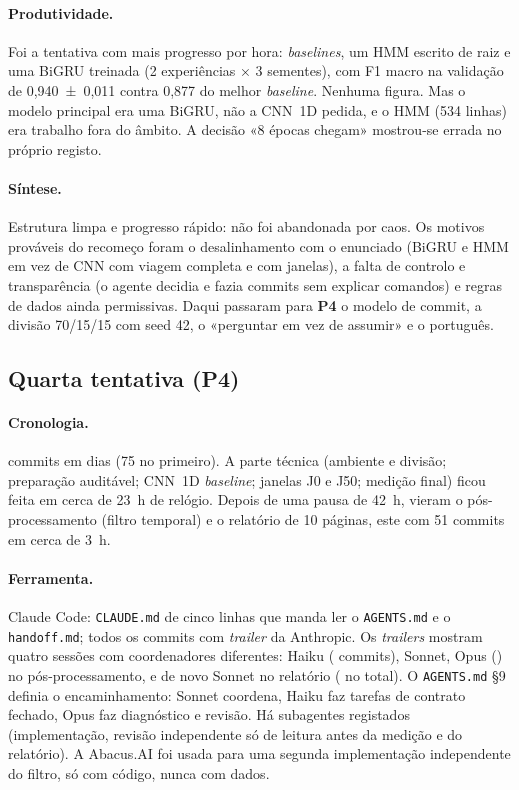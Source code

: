 \documentclass[11pt,a4paper]{article}
\newcommand{\Pquatro}{\textbf{P4}}
\begin{document}
\paragraph{Produtividade.} Foi a tentativa com mais progresso por hora: \emph{baselines},
um HMM escrito de raiz e uma BiGRU treinada (2 experiências × 3 sementes), com F1 macro na
validação de 0,940~±~0,011 contra 0,877 do melhor \emph{baseline}. Nenhuma figura. Mas o modelo
principal era uma BiGRU, não a CNN~1D pedida, e o HMM (534 linhas) era trabalho fora do âmbito.
A decisão «8 épocas chegam» mostrou-se errada no próprio registo.

\paragraph{Síntese.} Estrutura limpa e progresso rápido: não foi abandonada por caos. Os motivos prováveis
do recomeço foram o desalinhamento com o enunciado (BiGRU e HMM em vez de CNN com viagem completa
e com janelas), a falta de controlo e transparência (o agente decidia e fazia commits sem
explicar comandos) e regras de dados ainda permissivas. Daqui passaram para \Pquatro{} o modelo de
commit, a divisão 70/15/15 com seed 42, o «perguntar em vez de assumir» e o português.

\subsection{Quarta tentativa (\Pquatro)}

\paragraph{Cronologia.} \mQuatroCommits{} commits em \mQuatroDias{} dias (75 no primeiro).
A parte técnica (ambiente e divisão; preparação auditável; CNN~1D \emph{baseline}; janelas J0 e
J50; medição final) ficou feita em cerca de 23~h de relógio. Depois de uma pausa de 42~h, vieram o
pós-processamento (filtro temporal) e o relatório de 10 páginas, este com 51 commits em cerca de
3~h.

\paragraph{Ferramenta.} Claude Code: \texttt{CLAUDE.md} de cinco linhas que manda ler o
\texttt{AGENTS.md} e o \texttt{handoff.md}; todos os \mQuatroCoAutor{} commits com
\emph{trailer} da Anthropic. Os \emph{trailers} mostram quatro sessões com coordenadores
diferentes: Haiku (\mQuatroCoAutorHaiku{} commits), Sonnet, Opus (\mQuatroCoAutorOpus) no
pós-processamento, e de novo Sonnet no relatório (\mQuatroCoAutorSonnet{} no total). O
\texttt{AGENTS.md} §9 definia o encaminhamento: Sonnet coordena, Haiku faz tarefas de contrato
fechado, Opus faz diagnóstico e revisão. Há subagentes registados (implementação, revisão
independente só de leitura antes da medição e do relatório). A Abacus.AI foi usada para uma
segunda implementação independente do filtro, só com código, nunca com dados.
\end{document}
